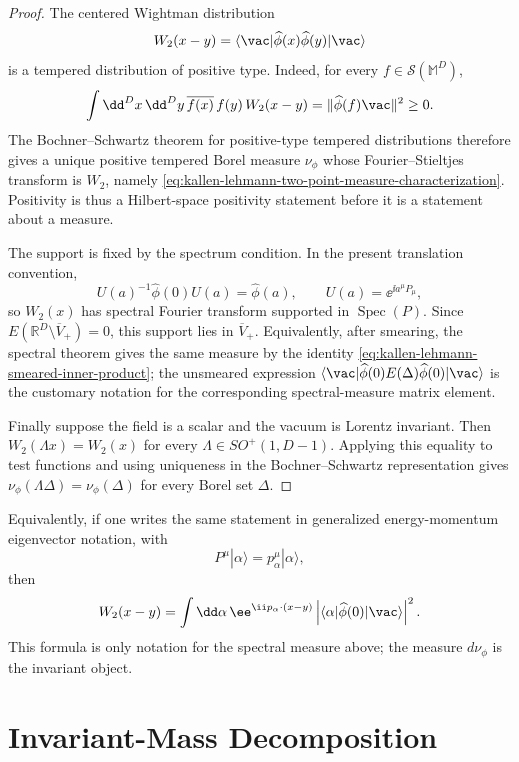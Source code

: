 \begin{proof}
The centered Wightman distribution
\[
  W_2(x-y)=
  \langle\vac|\widehat\phi(x)\widehat\phi(y)|\vac\rangle
\]
is a tempered distribution of positive type.  Indeed, for every
\(f\in\mathcal S(\mathbb M^D)\),
\[
  \int\dd^D x\,\dd^D y\,
    \overline{f(x)}\,f(y)\,W_2(x-y)
  =
  \|\widehat\phi(f)\vac\|^2
  \ge0 .
\]
The Bochner--Schwartz theorem for positive-type tempered distributions
therefore gives a unique positive tempered Borel measure \(\nu_\phi\) whose
Fourier--Stieltjes transform is \(W_2\), namely
\eqref{eq:kallen-lehmann-two-point-measure-characterization}.  Positivity is
thus a Hilbert-space positivity statement before it is a statement about a
measure.

The support is fixed by the spectrum condition.  In the present translation
convention,
\[
  U(a)^{-1}\widehat\phi(0)U(a)=\widehat\phi(a),
  \qquad
  U(a)=\ee^{\ii a^\mu P_\mu},
\]
so \(W_2(x)\) has spectral Fourier transform supported in
\(\operatorname{Spec}(P)\).  Since
\(E(\mathbb R^D\setminus\overline V_+)=0\), this support lies in
\(\overline V_+\).  Equivalently, after smearing, the spectral theorem gives
the same measure by the identity
\eqref{eq:kallen-lehmann-smeared-inner-product}; the unsmeared expression
\(\langle\vac|\widehat\phi(0)E(\Delta)\widehat\phi(0)|\vac\rangle\) is the
customary notation for the corresponding spectral-measure matrix element.

Finally suppose the field is a scalar and the vacuum is Lorentz invariant.
Then \(W_2(\Lambda x)=W_2(x)\) for every
\(\Lambda\in SO^+(1,D-1)\).  Applying this equality to test functions and
using uniqueness in the Bochner--Schwartz representation gives
\(\nu_\phi(\Lambda\Delta)=\nu_\phi(\Delta)\) for every Borel set \(\Delta\).
\end{proof}

Equivalently, if one writes the same statement in generalized
energy-momentum eigenvector notation, with
\[
  P^\mu|\alpha\rangle=p_\alpha^\mu|\alpha\rangle,
\]
then
\[
  W_2(x-y)
  =
  \int \dd\alpha\,
  \ee^{\ii p_\alpha\cdot(x-y)}
  \left|
    \langle\alpha|\widehat\phi(0)|\vac\rangle
  \right|^2 .
\]
This formula is only notation for the spectral measure above; the measure
\(d\nu_\phi\) is the invariant object.

\section{Invariant-Mass Decomposition}


